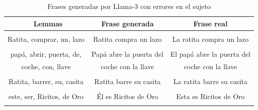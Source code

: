 \documentclass[11pt,spanish,listoffigures,listoftables]{tfgetsinf}
\begin{document}
\begin{table}[!h]
\caption{Frases generadas por Llama-3 con errores en el sujeto}
\begin{center}
\begin{tabular}{ c | c | c }
	\ Lemmas & Frase generada & Frase real \\
	\hline
	\hline
	 & & \\
	Ratita, comprar, un, lazo & Ratita compra un lazo & La ratita compra un lazo \\
	 & & \\
	papá, abrir, puerta, de,  & Papá abre la puerta del & El papá abre la puerta del \\
	 coche, con, llave & coche con la llave & coche con la llave \\
	 & & \\
	Ratita, barrer, su, casita & Ratita barre su casita & La ratita barre su casita \\
	 & & \\
	este, ser, Ricitos, de Oro & Él es Ricitos de Oro & Esta es Ricitos de Oro \\
	 & & \\

\end{tabular}
\end{center}
\label{tab:erroresSujeto}
\end{table}
\end{document}
